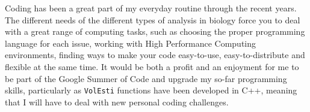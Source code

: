\documentclass{article}
\begin{document}
Coding has been a great part of my everyday routine through the recent years. 
The different needs of the different types of analysis in biology force you to deal with a great range of computing tasks, such as choosing the proper programming language for each issue, working with High Performance Computing environments, finding ways to make your code easy-to-use, easy-to-distribute and flexible at the same time. 
It would be both a profit and an enjoyment for me to be part of the Google Summer of Code and upgrade my so-far programming skills, particularly as \texttt{VolEsti} functions have been developed in C++, meaning that I will have to deal with new personal coding challenges. 











\printbibliography
\end{document}
